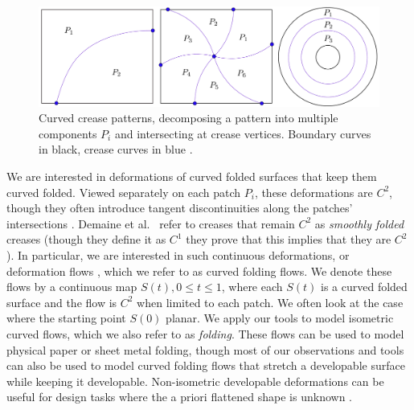 \begin{figure} [h]
	\centering
	\includegraphics[width=\linewidth]{figures/crease_patterns}
	\caption{Curved crease patterns, decomposing a pattern into multiple components $P_i$ and intersecting at crease vertices. Boundary curves in black, crease curves in blue .}
	\label{fig:crease_pattern}
\end{figure}

We are interested in deformations of curved folded surfaces that keep them curved folded. Viewed separately on each patch $P_i$, these deformations are $C^2$, though they often introduce tangent discontinuities along the patches' intersections . Demaine et al.~ refer to creases that remain $C^2$ as \emph{smoothly folded} creases (though they define it  as $C^1$ they prove that this implies that they  are $C^2$). In particular, we are interested in such  continuous deformations, or deformation flows \cite{rabi2018shape}, which we refer to as curved folding flows. We denote these flows by a continuous map $S(t), 0 \leq t \leq 1$, where each $S(t)$ is a curved folded surface and the flow is $C^2$ when limited to each patch. We often look at the case where the starting point $S(0)$ planar. We apply our tools to model isometric curved flows, which we also refer to as \emph{folding}. These flows can be used to model physical paper or sheet metal folding, though most of our observations and tools can also be used to model curved folding flows that stretch a developable surface while keeping it developable. Non-isometric developable deformations can be useful for design tasks where the a priori flattened shape is unknown \cite{rabi18,rabi2018shape,pottmann_new}.  

